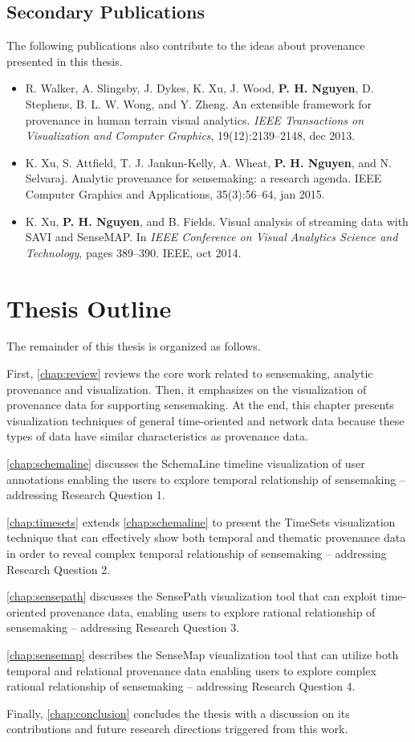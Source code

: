 \subsection{Secondary Publications} 
The following publications also contribute to the ideas about provenance presented in this thesis.

\begin{itemize}
\item R. Walker, A. Slingsby, J. Dykes, K. Xu, J. Wood, \textbf{P. H. Nguyen}, D. Stephens, B. L. W. Wong, and Y. Zheng. An extensible framework for provenance in human terrain visual analytics. \textit{IEEE Transactions on Visualization and Computer Graphics}, 19(12):2139--2148, dec 2013.
\item K. Xu, S. Attfield, T. J. Jankun-Kelly, A. Wheat, \textbf{P. H. Nguyen}, and N. Selvaraj. Analytic provenance for sensemaking: a research agenda. IEEE Computer Graphics and Applications, 35(3):56--64, jan 2015.
\item K. Xu, \textbf{P. H. Nguyen}, and B. Fields. Visual analysis of streaming data with SAVI and SenseMAP. In \textit{IEEE Conference on Visual Analytics Science and Technology}, pages 389--390. IEEE, oct 2014.
\end{itemize}

\section{Thesis Outline} 
The remainder of this thesis is organized as follows.

First, \autoref{chap:review} reviews the core work related to sensemaking, analytic provenance and visualization. Then, it emphasizes on the visualization of provenance data for supporting sensemaking. At the end, this chapter presents visualization techniques of general time-oriented and network data because these types of data have similar characteristics as provenance data.

\autoref{chap:schemaline} discusses the SchemaLine timeline visualization of user annotations enabling the users to explore temporal relationship of sensemaking -- addressing Research Question 1.

\autoref{chap:timesets} extends \autoref{chap:schemaline} to present the TimeSets visualization technique that can effectively show both temporal and thematic provenance data in order to reveal complex temporal relationship of sensemaking -- addressing Research Question 2.

\autoref{chap:sensepath} discusses the SensePath visualization tool that can exploit time-oriented provenance data, enabling users to explore rational relationship of sensemaking -- addressing Research Question 3.

\autoref{chap:sensemap} describes the SenseMap visualization tool that can utilize both temporal and relational provenance data enabling users to explore complex rational relationship of sensemaking -- addressing Research Question 4.

Finally, \autoref{chap:conclusion} concludes the thesis with a discussion on its contributions and future research directions triggered from this work.